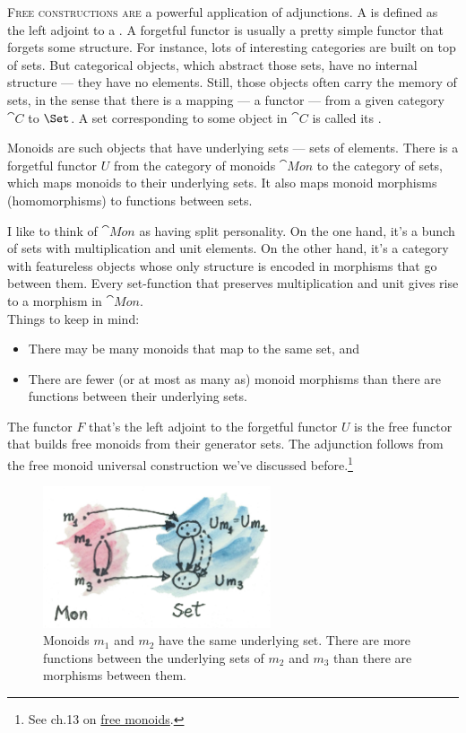 
\lettrine[lhang=0.17]{F}{ree constructions are} a powerful application of adjunctions. A
 is defined as the left adjoint to a . A forgetful functor is usually a pretty simple functor that
forgets some structure. For instance, lots of interesting categories are
built on top of sets. But categorical objects, which abstract those
sets, have no internal structure --- they have no elements. Still, those
objects often carry the memory of sets, in the sense that there is a
mapping --- a functor --- from a given category $\cat{C}$ to
$\Set$. A set corresponding to some object in $\cat{C}$ is called
its .

Monoids are such objects that have underlying sets --- sets of elements.
There is a forgetful functor $U$ from the category of monoids
$\cat{Mon}$ to the category of sets, which maps monoids to their
underlying sets. It also maps monoid morphisms (homomorphisms) to
functions between sets.

I like to think of $\cat{Mon}$ as having split personality. On the one
hand, it's a bunch of sets with multiplication and unit elements. On the
other hand, it's a category with featureless objects whose only
structure is encoded in morphisms that go between them. Every
set-function that preserves multiplication and unit gives rise to a
morphism in $\cat{Mon}$.\\
\newline
Things to keep in mind:

\begin{itemize}
\tightlist
\item
  There may be many monoids that map to the same set, and
\item
  There are fewer (or at most as many as) monoid morphisms than there
  are functions between their underlying sets.
\end{itemize}

\noindent
The functor $F$ that's the left adjoint to the forgetful functor
$U$ is the free functor that builds free monoids from their
generator sets. The adjunction follows from the free monoid
universal construction we've discussed before.\footnote{See ch.13 on
\hyperref[free-monoids]{free monoids}.}

\begin{figure}[H]
\centering
\includegraphics[width=0.6\textwidth]{images/forgetful.jpg}
\caption{Monoids $m_1$ and $m_2$ have the same
  underlying set. There are more functions between the underlying sets of
  $m_2$ and $m_3$ than there are morphisms
  between them.}
\end{figure}
  
